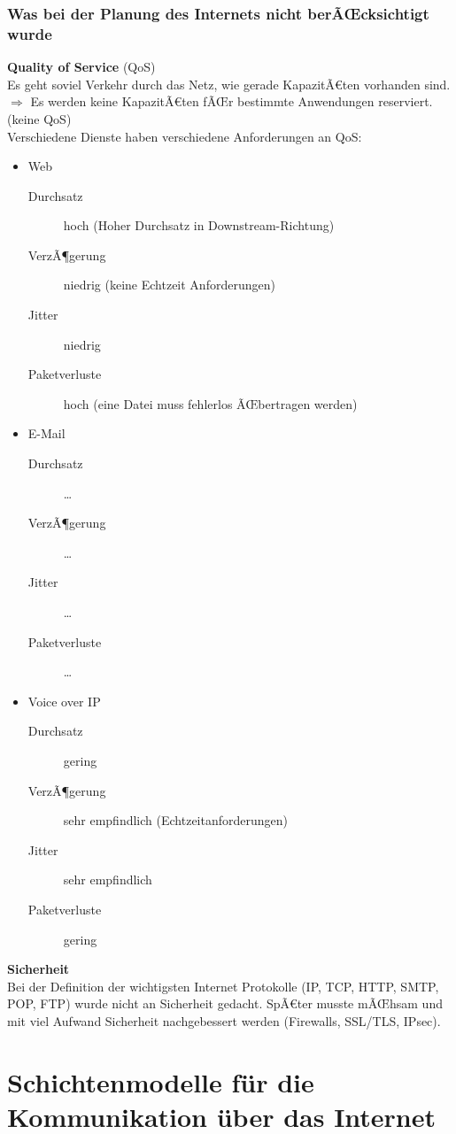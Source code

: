 \documentclass[a4paper,10pt]{article}
\newcommand{\Bold}[1]{\textbf{#1}} %
\newcommand{\Ra}{\Rightarrow}
\begin{document}
\subsubsection{Was bei der Planung des Internets nicht berÃŒcksichtigt wurde}
\Bold{Quality of Service} (QoS)\\
Es geht soviel Verkehr durch das Netz, wie gerade KapazitÃ€ten vorhanden sind. $\Ra$ Es werden keine KapazitÃ€ten fÃŒr bestimmte Anwendungen reserviert. (keine QoS)\\
Verschiedene Dienste haben verschiedene Anforderungen an QoS:
\begin{itemize}
 \item Web
 \begin{description}
  \item[Durchsatz] hoch (Hoher Durchsatz in Downstream-Richtung)
  \item[VerzÃ¶gerung] niedrig (keine Echtzeit Anforderungen)
  \item[Jitter] niedrig
  \item[Paketverluste] hoch (eine Datei muss fehlerlos ÃŒbertragen werden)
 \end{description}
 \item E-Mail
 \begin{description}
  \item[Durchsatz] \dots
  \item[VerzÃ¶gerung] \dots
  \item[Jitter] \dots
  \item[Paketverluste] \dots
 \end{description}
 \item Voice over IP
  \begin{description}
  \item[Durchsatz] gering
  \item[VerzÃ¶gerung] sehr empfindlich (Echtzeitanforderungen)
  \item[Jitter] sehr empfindlich
  \item[Paketverluste] gering
 \end{description}
\end{itemize}
\Bold{Sicherheit}\\
Bei der Definition der wichtigsten Internet Protokolle (IP, TCP, HTTP, SMTP, POP, FTP) wurde nicht an Sicherheit gedacht. SpÃ€ter musste mÃŒhsam und mit viel Aufwand Sicherheit nachgebessert werden (Firewalls, SSL/TLS, IPsec).
\section{Schichtenmodelle für die Kommunikation über das Internet}
\end{document}
